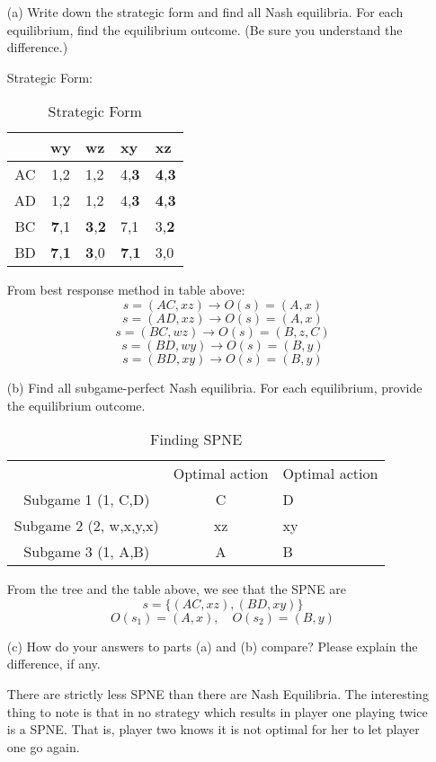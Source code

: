 \documentclass[11pt]{article}
\begin{document}
\begin{enumerate}
    \item[(a)] Write down the strategic form and find all Nash equilibria. For each equilibrium, find the equilibrium outcome. (Be sure you understand the difference.)
    \begin{solution}
    Strategic Form:
    \begin{table}[H]
        \centering
        \begin{tabular}{|c|c|l|l|l|} \hline 
 & wy&wz &xy &xz\\ \hline 
AC& 1,2& 1,2& 4,\textbf{3}&\textbf{4},\textbf{3}\\ \hline 
AD& 1,2&  1,2& 4,\textbf{3}&\textbf{4},\textbf{3}\\ \hline
BC& \textbf{7},1& \textbf{3},\textbf{2}& 7,1&3,\textbf{2}\\\hline
BD& \textbf{7},\textbf{1}& \textbf{3},0& \textbf{7},\textbf{1}&3,0\\\hline\end{tabular}
        \caption{Strategic Form}
    \end{table}
    From best response method in table above:
    \[\boxed{s = (AC, xz) \to O(s) = (A,x)} \]
    \[\boxed{s = (AD, xz) \to O(s) = (A,x)}\]
    \[\boxed{s = (BC, wz) \to O(s) = (B,z ,C)}\]
    \[\boxed{s = (BD, wy) \to O(s) = (B,y)}\]
    \[\boxed{s = (BD, xy) \to O(s) = (B,y)}\]
        \end{solution}
    \item[(b)] Find all subgame-perfect Nash equilibria. For each equilibrium, provide the equilibrium outcome.
    \begin{solution}
    \begin{table}[H]
        \centering
        \begin{tabular}{c|cl}
 &Optimal action  &Optimal action  \\
             Subgame 1 (1, C,D)&  C&D\\
             Subgame 2 (2, w,x,y,x)& 
         xz&xy\\
 Subgame 3 (1, A,B)& A&B\\\end{tabular}
        \caption{Finding SPNE}
    \end{table}
        From the tree and the table above, we see that the SPNE are 
        \[\boxed{ s= \{(AC, xz), (BD, xy)\}}\]
        \[\boxed{O(s_1) = (A,x)}, \quad \boxed{O(s_2) = (B, y)}\]
    \end{solution}
    \item[(c)] How do your answers to parts (a) and (b) compare? Please explain the difference, if any.
    \begin{solution}
        There are strictly less SPNE than there are Nash Equilibria. The interesting thing to note is that in no strategy which results in player one playing twice is a SPNE. That is, player two knows it is not optimal for her to let player one go again. 
    \end{solution}
\end{enumerate}
\end{document}
